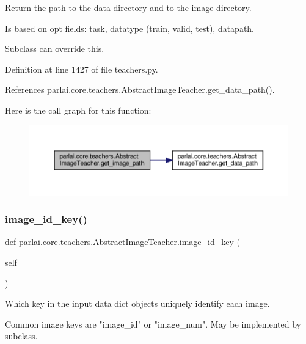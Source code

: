 \begin{DoxyVerb}Return the path to the data directory and to the image directory.

Is based on opt fields: task, datatype (train, valid, test), datapath.

Subclass can override this.
\end{DoxyVerb}
 

Definition at line 1427 of file teachers.\+py.



References parlai.\+core.\+teachers.\+Abstract\+Image\+Teacher.\+get\+\_\+data\+\_\+path().

Here is the call graph for this function\+:
\nopagebreak
\begin{figure}[H]
\begin{center}
\leavevmode
\includegraphics[width=350pt]{classparlai_1_1core_1_1teachers_1_1AbstractImageTeacher_a22a280003b7f4202e0d917040bd56eb8_cgraph}
\end{center}
\end{figure}
\mbox{\label{classparlai_1_1core_1_1teachers_1_1AbstractImageTeacher_ada83f1832b7c75f9daab8e4d196ba893}} 
\subsubsection{\texorpdfstring{image\+\_\+id\+\_\+key()}{image\_id\_key()}}
{\footnotesize\ttfamily def parlai.\+core.\+teachers.\+Abstract\+Image\+Teacher.\+image\+\_\+id\+\_\+key (\begin{DoxyParamCaption}\item[{}]{self }\end{DoxyParamCaption})}

\begin{DoxyVerb}Which key in the input data dict objects uniquely identify each image.

Common image keys are "image_id" or "image_num". May be implemented by
subclass.
\end{DoxyVerb}
 

